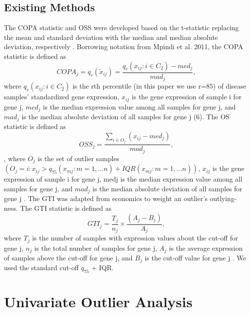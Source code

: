 \documentclass[11pt, a4paper]{article}
\begin{document}
\subsection{Existing Methods}
The COPA statistic and OSS were developed based on the t-statistic replacing the mean and standard deviation with the median and median absolute deviation, respectively \cite{gti,oss,copa}. Borrowing notation from Mpindi et al. 2011, the COPA statistic is defined as
\begin{equation}
COPA_j=q_r(\tilde{x}_{ij})=\frac{q_r(x_{ij}:i \in C_2)-med_j}{mad_j},
\end{equation}
where $ q_r(x_{ij}:i \in C_2) $ is the rth percentile (in this paper we use r=85) of disease samples’ standardized gene expression, $x_{ij}$ is the gene expression of sample i for gene j, $med_j$ is the median expression value among all samples for gene j, and $mad_j$ is the median absolute deviation of all samples for gene j (6).  
	The OS statistic is defined as
\begin{equation}
OSS_j=\frac{\sum_{i\in O_j}(x_{ij}-med_j)}{mad_j},
\end{equation},
where $O_j$ is the set of outlier samples \\
$(O_j={i: x_{ij} > q_{75}(x_{mj}:m=1,…n)+IQR(x_{mj}:m=1,\dots n)})$, $x_{ij}$ is the gene expression of sample i for gene j, medj is the median expression value among all samples for gene j, and $mad_j$ is the median absolute deviation of all samples for gene j \cite{gti,oss}. 
The GTI was adapted from economics to weight an outlier’s outlying-ness. The GTI statistic is defined as
\begin{equation}
GTI_j=\frac{T_j}{n_j}\times \frac{(A_j-B_j)}{A_j},
\end{equation}
where $T_j$ is the number of samples with expression values about the cut-off for gene j, $n_j$ is the total number of samples for gene j, $A_j$ is the average expression of samples above the cut-off for gene j, and $B_j$ is the cut-off value for gene j \cite{gti}. We used the standard cut-off $q_{75}$ + IQR.

\section{Univariate Outlier Analysis}
\end{document}
